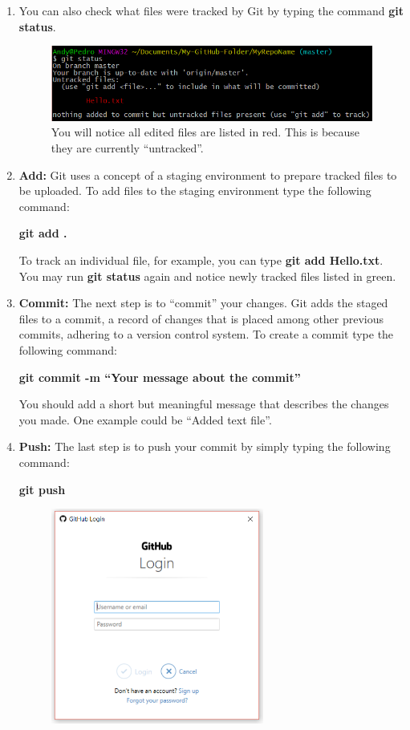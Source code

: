 \documentclass[12pt]{article}
\begin{document}
\begin{enumerate}
    \newpage
    \item You can also check what files were tracked by Git by typing the command \textbf{git status}.
        \begin{figure}[h!]
            \includegraphics[width=12cm, center]{Git-status}
            \caption{You will notice all edited files are listed in red. This is because they are currently ``untracked''.}
        \end{figure}
    \item \textbf{Add:} Git uses a concept of a staging environment to prepare tracked files to be uploaded. To add files to the staging environment type the following command:
    \begin{center}
       \textbf{git add .} 
    \end{center}
    To track an individual file, for example, you can type \textbf{git add Hello.txt}. You may run \textbf{git status} again and notice newly tracked files listed in green.
    \item \textbf{Commit:} The next step is to ``commit'' your changes. Git adds the staged files to a commit, a record of changes that is placed among other previous commits, adhering to a version control system. To create a commit type the following command:
    \begin{center}
       \textbf{git commit -m ``Your message about the commit''}
    \end{center}
    You should add a short but meaningful message that describes the changes you made. One example could be ``Added text file''.
    \item \textbf{Push:} The last step is to push your commit by simply typing the following command:
    \begin{center}
       \textbf{git push}
    \end{center}
    \newpage
    \begin{figure}[h!]
        \includegraphics[width=7cm, center]{Git-push}

\end{figure}
\end{enumerate}
\end{document}
